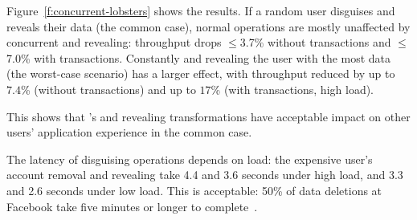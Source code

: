 %
Figure~\ref{f:concurrent-lobsters} shows the results.
%
If a random user disguises and reveals their data (the common case),
normal operations are mostly unaffected by concurrent \xxing and revealing:
throughput drops $\le$3.7\% without transactions and $\le$7.0\% with transactions.
%
Constantly \xxing and revealing the user with the most data (the worst-case
scenario) has a larger effect, with throughput reduced by up to $7.4$\%
(without transactions) and up to $17$\% (with transactions, high load).
%
%
%

This shows that \sys's \xxing and revealing transformations have acceptable
impact on other users' application experience in the common case.
%
%
%

The latency of disguising operations depends on load:
the expensive user's account removal and revealing take 4.4 and 3.6 seconds
under high load, and 3.3 and 2.6 seconds under low load.
%
This is acceptable: 50\% of data deletions at Facebook take five minutes or
longer to complete~\cite{delf}.
%


